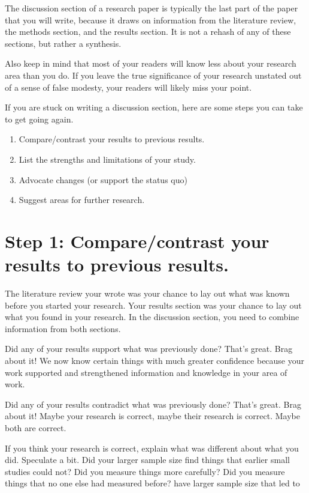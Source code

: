 \documentclass[
  letterpaper,
  DIV=11,
  numbers=noendperiod]{scrreprt}
\providecommand{\tightlist}{%
  \setlength{\itemsep}{0pt}\setlength{\parskip}{0pt}}
\begin{document}
\begin{tcolorbox}
The discussion section of a research paper is typically the last part of
the paper that you will write, because it draws on information from the
literature review, the methods section, and the results section. It is
not a rehash of any of these sections, but rather a synthesis.

Also keep in mind that most of your readers will know less about your
research area than you do. If you leave the true significance of your
research unstated out of a sense of false modesty, your readers will
likely miss your point.

If you are stuck on writing a discussion section, here are some steps
you can take to get going again.

\begin{enumerate}
\def\labelenumi{\arabic{enumi}.}
\tightlist
\item
  Compare/contrast your results to previous results.
\item
  List the strengths and limitations of your study.
\item
  Advocate changes (or support the status quo)
\item
  Suggest areas for further research.
\end{enumerate}

\section{Step 1: Compare/contrast your results to previous
results.}\label{step-1-comparecontrast-your-results-to-previous-results.}

The literature review your wrote was your chance to lay out what was
known before you started your research. Your results section was your
chance to lay out what you found in your research. In the discussion
section, you need to combine information from both sections.

Did any of your results support what was previously done? That's great.
Brag about it! We now know certain things with much greater confidence
because your work supported and strengthened information and knowledge
in your area of work.

Did any of your results contradict what was previously done? That's
great. Brag about it! Maybe your research is correct, maybe their
research is correct. Maybe both are correct.

If you think your research is correct, explain what was different about
what you did. Speculate a bit. Did your larger sample size find things
that earlier small studies could not? Did you measure things more
carefully? Did you measure things that no one else had measured before?
have larger sample size that led to


\end{tcolorbox}
\end{document}
